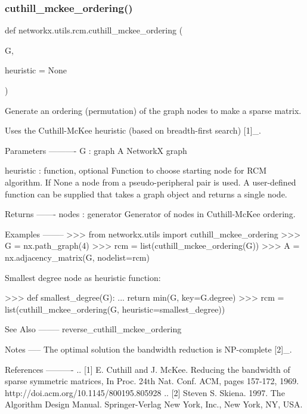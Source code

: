\mbox{\label{namespacenetworkx_1_1utils_1_1rcm_a5e0d7595f93e977085ad12f692130cca}} 
\subsubsection{\texorpdfstring{cuthill\+\_\+mckee\+\_\+ordering()}{cuthill\_mckee\_ordering()}}
{\footnotesize\ttfamily def networkx.\+utils.\+rcm.\+cuthill\+\_\+mckee\+\_\+ordering (\begin{DoxyParamCaption}\item[{}]{G,  }\item[{}]{heuristic = {\ttfamily None} }\end{DoxyParamCaption})}

\begin{DoxyVerb}Generate an ordering (permutation) of the graph nodes to make
a sparse matrix.

Uses the Cuthill-McKee heuristic (based on breadth-first search) [1]_.

Parameters
----------
G : graph
  A NetworkX graph

heuristic : function, optional
  Function to choose starting node for RCM algorithm.  If None
  a node from a pseudo-peripheral pair is used.  A user-defined function
  can be supplied that takes a graph object and returns a single node.

Returns
-------
nodes : generator
   Generator of nodes in Cuthill-McKee ordering.

Examples
--------
>>> from networkx.utils import cuthill_mckee_ordering
>>> G = nx.path_graph(4)
>>> rcm = list(cuthill_mckee_ordering(G))
>>> A = nx.adjacency_matrix(G, nodelist=rcm)

Smallest degree node as heuristic function:

>>> def smallest_degree(G):
...     return min(G, key=G.degree)
>>> rcm = list(cuthill_mckee_ordering(G, heuristic=smallest_degree))


See Also
--------
reverse_cuthill_mckee_ordering

Notes
-----
The optimal solution the bandwidth reduction is NP-complete [2]_.


References
----------
.. [1] E. Cuthill and J. McKee.
   Reducing the bandwidth of sparse symmetric matrices,
   In Proc. 24th Nat. Conf. ACM, pages 157-172, 1969.
   http://doi.acm.org/10.1145/800195.805928
.. [2]  Steven S. Skiena. 1997. The Algorithm Design Manual.
   Springer-Verlag New York, Inc., New York, NY, USA.
\end{DoxyVerb}
 \mbox{\label{namespacenetworkx_1_1utils_1_1rcm_a8af72dd56bbafa66755a2b7a30e2fc8c}} 
